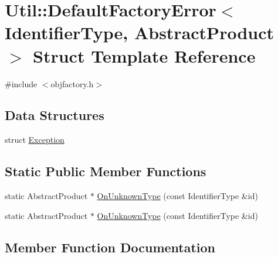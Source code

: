 \hypertarget{structUtil_1_1DefaultFactoryError}{}\section{Util\+:\+:Default\+Factory\+Error$<$ Identifier\+Type, Abstract\+Product $>$ Struct Template Reference}
\label{structUtil_1_1DefaultFactoryError}


{\ttfamily \#include $<$objfactory.\+h$>$}

\subsection*{Data Structures}
\begin{DoxyCompactItemize}
\item 
struct \mbox{\hyperlink{structUtil_1_1DefaultFactoryError_1_1Exception}{Exception}}
\end{DoxyCompactItemize}
\subsection*{Static Public Member Functions}
\begin{DoxyCompactItemize}
\item 
static Abstract\+Product $\ast$ \mbox{\hyperlink{structUtil_1_1DefaultFactoryError_a09811b515633321285301106058d1560}{On\+Unknown\+Type}} (const Identifier\+Type \&id)
\item 
static Abstract\+Product $\ast$ \mbox{\hyperlink{structUtil_1_1DefaultFactoryError_a09811b515633321285301106058d1560}{On\+Unknown\+Type}} (const Identifier\+Type \&id)
\end{DoxyCompactItemize}


\subsection{Member Function Documentation}
\mbox{\label{structUtil_1_1DefaultFactoryError_a09811b515633321285301106058d1560}} 

